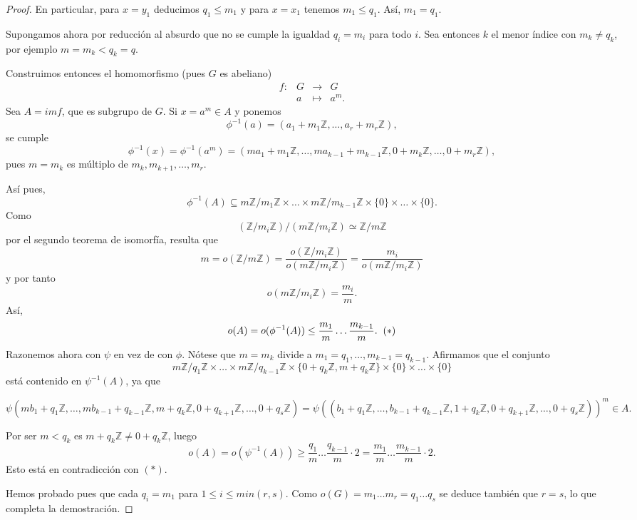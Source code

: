 \documentclass[12pt]{article}
\begin{document}
\begin{proof}
En particular, para $x = y_1$ deducimos $q_1 \leq m_1$ y para $x = x_1$ tenemos $m_1 \leq q_1$. Así, $m_1 = q_1$.

Supongamos ahora por reducción al absurdo que no se cumple la igualdad $q_i = m_i$ para todo $i$. Sea entonces $k$ el menor índice con $m_k \neq q_k$, por ejemplo $m = m_k < q_k = q.$

Construimos entonces el homomorfismo (pues $G$ es abeliano) $$\begin{array}{rccl}
f\colon &G& \longrightarrow &G\\
&a& \longmapsto &a^m.
\end{array}
$$
Sea $A = im f$, que es subgrupo de $G$. Si $x = a^m \in A$ y ponemos $$\phi^{-1}(a) = (a_1 + m_1 \mathbb{Z}, \ldots, a_r + m_r \mathbb{Z}),$$ se cumple $$\phi^{-1}(x) = \phi^{-1}(a^m) = (ma_1 + m_1\mathbb{Z}, \ldots, ma_{k-1} + m_{k-1}\mathbb{Z}, 0 + m_k\mathbb{Z}, \ldots, 0 + m_r\mathbb{Z}),$$ pues $m = m_k$ es múltiplo de $m_k, m_{k+1}, \ldots, m_r.$

Así pues, $$\phi^{-1}(A) \subseteq m\mathbb{Z}/m_1\mathbb{Z} \times \ldots \times m\mathbb{Z}/m_{k-1}\mathbb{Z} \times \lbrace 0 \rbrace \times \ldots \times \lbrace 0 \rbrace.$$ Como $$(\mathbb{Z}/m_i\mathbb{Z})/(m\mathbb{Z}/m_i\mathbb{Z}) \simeq \mathbb{Z}/m\mathbb{Z}$$ por el segundo teorema de isomorfía, resulta que $$m = o(\mathbb{Z}/m\mathbb{Z}) = \dfrac{o(\mathbb{Z}/m_i\mathbb{Z})}{o(m\mathbb{Z}/m_i\mathbb{Z})} = \dfrac{m_i}{o(m\mathbb{Z}/m_i\mathbb{Z})}$$ y por tanto $$o(m\mathbb{Z}/m_i \mathbb{Z}) = \dfrac{m_i}{m}.$$
Así, $$o(A) = o(\phi^{-1}(A)) \leq \dfrac{m_1}{m}\ldots \dfrac{m_{k-1}}{m}. \hspace{0.2cm} (\ast)$$ 
Razonemos ahora con $\psi$ en vez de con $\phi$. Nótese que $m = m_k$ divide a $m_1 = q_1, \ldots, m_{k-1} = q_{k-1}.$ Afirmamos que el conjunto $$m\mathbb{Z}/q_1\mathbb{Z} \times \ldots \times m\mathbb{Z}/q_{k-1}\mathbb{Z} \times \lbrace 0+ q_k\mathbb{Z}, m + q_k\mathbb{Z} \rbrace \times \lbrace 0 \rbrace \times \ldots \times \lbrace 0 \rbrace$$ está contenido en $\psi^{-1}(A)$, ya que 
\begin{center}$\psi(mb_1 + q_1 \mathbb{Z}, \ldots, mb_{k-1} + q_{k-1}\mathbb{Z}, m + q_k\mathbb{Z}, 0 + q_{k+1}\mathbb{Z}, \ldots, 0 + q_s\mathbb{Z}) = \psi((b_1 + q_1\mathbb{Z}, \ldots, b_{k-1}+q_{k-1}\mathbb{Z}, 1 + q_k\mathbb{Z}, 0 + q_{k+1}\mathbb{Z}, \ldots, 0+q_s\mathbb{Z}))^m \in A.$\end{center}
Por ser $m< q_k$ es $m + q_k\mathbb{Z} \neq 0 + q_k\mathbb{Z}$, luego $$o(A) = o(\psi^{-1}(A)) \geq \dfrac{q_1}{m} \ldots \dfrac{q_{k-1}}{m} \cdot 2 = \dfrac{m_1}{m} \ldots \dfrac{m_{k-1}}{m} \cdot 2.$$ Esto está en contradicción con $(\ast)$. 

Hemos probado pues que cada $q_i = m_1$ para $1 \leq i \leq min(r,s)$. Como $o(G) = m_1 \ldots m_r = q_1 \ldots q_s$ se deduce también que $r=s$, lo que completa la demostración.

\end{proof}
\end{document}
